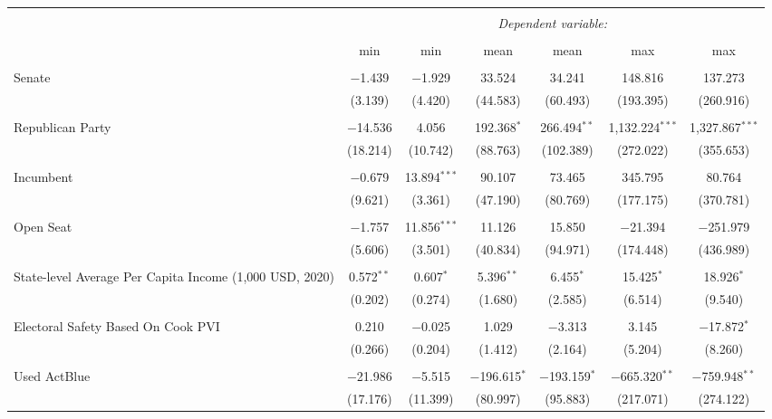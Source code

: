 
\begin{tabular}{@{\extracolsep{5pt}}lcccccc} 
\\[-1.8ex]\hline 
\hline \\[-1.8ex] 
 & \multicolumn{6}{c}{\textit{Dependent variable:}} \\ 
\cline{2-7} 
\\[-1.8ex] & min & min & mean & mean & max & max \\ 
\hline \\[-1.8ex] 
 Senate & $-$1.439 & $-$1.929 & 33.524 & 34.241 & 148.816 & 137.273 \\ 
  & (3.139) & (4.420) & (44.583) & (60.493) & (193.395) & (260.916) \\ 
  & & & & & & \\ 
 Republican Party & $-$14.536 & 4.056 & 192.368$^{*}$ & 266.494$^{**}$ & 1,132.224$^{***}$ & 1,327.867$^{***}$ \\ 
  & (18.214) & (10.742) & (88.763) & (102.389) & (272.022) & (355.653) \\ 
  & & & & & & \\ 
 Incumbent & $-$0.679 & 13.894$^{***}$ & 90.107 & 73.465 & 345.795 & 80.764 \\ 
  & (9.621) & (3.361) & (47.190) & (80.769) & (177.175) & (370.781) \\ 
  & & & & & & \\ 
 Open Seat & $-$1.757 & 11.856$^{***}$ & 11.126 & 15.850 & $-$21.394 & $-$251.979 \\ 
  & (5.606) & (3.501) & (40.834) & (94.971) & (174.448) & (436.989) \\ 
  & & & & & & \\ 
 State-level Average Per Capita Income (1,000 USD, 2020) & 0.572$^{**}$ & 0.607$^{*}$ & 5.396$^{**}$ & 6.455$^{*}$ & 15.425$^{*}$ & 18.926$^{*}$ \\ 
  & (0.202) & (0.274) & (1.680) & (2.585) & (6.514) & (9.540) \\ 
  & & & & & & \\ 
 Electoral Safety Based On Cook PVI & 0.210 & $-$0.025 & 1.029 & $-$3.313 & 3.145 & $-$17.872$^{*}$ \\ 
  & (0.266) & (0.204) & (1.412) & (2.164) & (5.204) & (8.260) \\ 
  & & & & & & \\ 
 Used ActBlue & $-$21.986 & $-$5.515 & $-$196.615$^{*}$ & $-$193.159$^{*}$ & $-$665.320$^{**}$ & $-$759.948$^{**}$ \\ 
  & (17.176) & (11.399) & (80.997) & (95.883) & (217.071) & (274.122) \\ 

\end{tabular}
